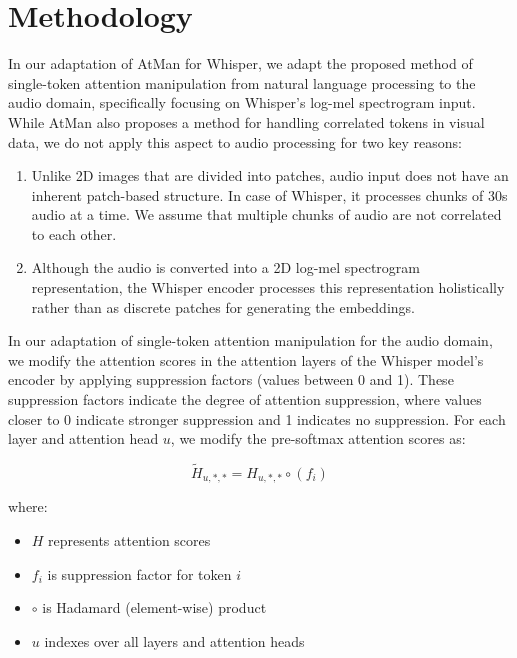 \documentclass[../report.tex]{subfiles}
\begin{document}
    \section{Methodology}
    \label{sec:methodology}



    In our adaptation of AtMan for Whisper, we adapt the proposed method of single-token attention manipulation from natural language processing to the audio domain, specifically focusing on Whisper's log-mel spectrogram input. While AtMan also proposes a method for handling correlated tokens in visual data, we do not apply this aspect to audio processing for two key reasons:
    
    \begin{enumerate}
        \item Unlike 2D images that are divided into patches, audio input does not have an inherent patch-based structure. In case of Whisper, it processes chunks of 30s audio at a time. We assume that multiple chunks of audio are not correlated to each other.
        \item Although the audio is converted into a 2D log-mel spectrogram representation, the Whisper encoder processes this representation holistically rather than as discrete patches for generating the embeddings.
    \end{enumerate}

    In our adaptation of single-token attention manipulation for the audio domain, we modify the attention scores in the attention layers of the Whisper model's encoder by applying suppression factors (values between 0 and 1). These suppression factors indicate the degree of attention suppression, where values closer to 0 indicate stronger suppression and 1 indicates no suppression. For each layer and attention head $u$, we modify the pre-softmax attention scores as:

    \begin{equation}
    \tilde{H}_{u,*,*} = H_{u,*,*} \circ (f_i)
    \end{equation}

    where:
    \begin{itemize}
    \item $H$ represents attention scores
    \item $f_i$ is suppression factor for token $i$
    \item $\circ$ is Hadamard (element-wise) product
    \item $u$ indexes over all layers and attention heads
    \end{itemize}
        
\end{document}
